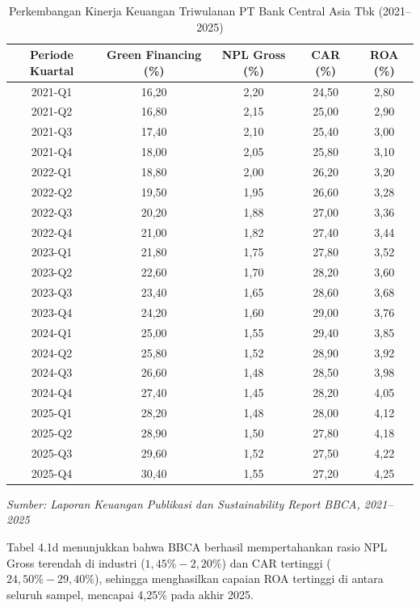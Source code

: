 \documentclass[12pt,a4paper]{article}
\numberwithin{equation}{section}
\begin{document}
\begin{table}[H]
  \caption{Perkembangan Kinerja Keuangan Triwulanan PT Bank Central Asia Tbk (2021--2025)}
  \label{tab:kinerja_bbca}
  \small
  \begin{tabularx}{\textwidth}{|c|c|c|c|c|}
    \hline
    \textbf{Periode Kuartal} & \textbf{Green Financing (\%)} & \textbf{NPL Gross (\%)} & \textbf{CAR (\%)} & \textbf{ROA (\%)} \\
    \hline
    2021-Q1 & 16,20 & 2,20 & 24,50 & 2,80 \\
    2021-Q2 & 16,80 & 2,15 & 25,00 & 2,90 \\
    2021-Q3 & 17,40 & 2,10 & 25,40 & 3,00 \\
    2021-Q4 & 18,00 & 2,05 & 25,80 & 3,10 \\
    \hline
    2022-Q1 & 18,80 & 2,00 & 26,20 & 3,20 \\
    2022-Q2 & 19,50 & 1,95 & 26,60 & 3,28 \\
    2022-Q3 & 20,20 & 1,88 & 27,00 & 3,36 \\
    2022-Q4 & 21,00 & 1,82 & 27,40 & 3,44 \\
    \hline
    2023-Q1 & 21,80 & 1,75 & 27,80 & 3,52 \\
    2023-Q2 & 22,60 & 1,70 & 28,20 & 3,60 \\
    2023-Q3 & 23,40 & 1,65 & 28,60 & 3,68 \\
    2023-Q4 & 24,20 & 1,60 & 29,00 & 3,76 \\
    \hline
    2024-Q1 & 25,00 & 1,55 & 29,40 & 3,85 \\
    2024-Q2 & 25,80 & 1,52 & 28,90 & 3,92 \\
    2024-Q3 & 26,60 & 1,48 & 28,50 & 3,98 \\
    2024-Q4 & 27,40 & 1,45 & 28,20 & 4,05 \\
    \hline
    2025-Q1 & 28,20 & 1,48 & 28,00 & 4,12 \\
    2025-Q2 & 28,90 & 1,50 & 27,80 & 4,18 \\
    2025-Q3 & 29,60 & 1,52 & 27,50 & 4,22 \\
    2025-Q4 & 30,40 & 1,55 & 27,20 & 4,25 \\
    \hline
  \end{tabularx}
  \begin{flushleft}
    \textit{Sumber: Laporan Keuangan Publikasi dan Sustainability Report BBCA, 2021--2025}
  \end{flushleft}
\end{table}

\noindent
Tabel 4.1d menunjukkan bahwa BBCA berhasil mempertahankan rasio NPL Gross terendah di industri ($1{,}45\% - 2{,}20\%$) dan CAR tertinggi ($24{,}50\% - 29{,}40\%$), sehingga menghasilkan capaian ROA tertinggi di antara seluruh sampel, mencapai 4,25\% pada akhir 2025.
\end{document}
